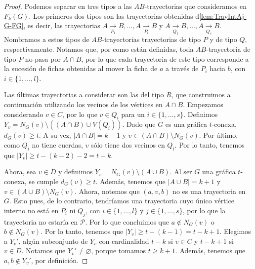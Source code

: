 \begin{proof}
    Podemos separar en tres tipos a las $AB$-trayectorias que consideramos en
    $F_{k}(G)$. Los primeros dos tipos son las trayectorias obtenidas
    d\cref{lem:TrayIntAj-G-FG}, es decir, las trayectorias $A
    \xrightarrow[P_1]{}  B, \dots, A \xrightarrow[P_l]{}  B$ y $A
    \xrightarrow[Q_1]{}  B, \dots, A \xrightarrow[Q_s]{}  B$. Nombramos a estos
    tipos de $AB$-trayectorias trayectorias de tipo $P$ y de tipo $Q$,
    respectivamente. Notamos que, por como est\'an definidas, toda
    $AB$-trayectoria de tipo $P$ no pasa por $A\cap B$, por lo que cada
    trayectoria de este tipo corresponde a la sucesi\'on de fichas obtenidas al
    mover la ficha de $a$ a trav\'es de $P_i$ hacia $b$, con $i \in \{1, \dots,
    l\}$.
    
    Las \'ultimas trayectorias a considerar son las del tipo $R$, que
    construimos a continuaci\'on utilizando los vecinos de los v\'ertices en $A
    \cap B$. Empezamos considerando $v \in C$, por lo que $v \in Q_i$ para un
    $i \in \{1, \dots, s\}$. Definimos $Y_v = N_G(v) \setminus ((A \cap B) \cup
    V(Q_i))$. Dado que $G$ es una gr\'afica $t$-conexa, $d_G(v) \geq t$. A su
    vez, $|A \cap B| =k -1$ y $v \in (A \cap B) \setminus N_G(v)$. Por \'ultimo,
    como $Q_i$ no tiene cuerdas, $v$ s\'olo tiene dos vecinos en $Q_i$. Por lo
    tanto, tenemos que $|Y_v| \geq t- (k-2)-2 = t-k$. 
    
    Ahora, sea $v \in D$ y definimos $Y_v = N_G(v) \setminus (A \cup B)$. Al ser
    $G$ una gr\'afica $t$-conexa, se cumple $d_G(v) \geq t$. Adem\'as, tenemos
    que $|A \cup B| = k + 1$ y $v \in (A \cup B) \setminus N_G(v)$. Ahora,
    notemos que $(a, v, b)$ no es una trayectoria en $G$. Esto pues, de lo
    contrario, tendr\'iamos una trayectoria cuyo \'unico v\'ertice interno no
    est\'a en $P_i$ ni $Q_j$, con $i \in \{1, \dots, l\}$ y $j \in \{1, \dots,
    s\}$, por lo que la trayectoria no estar\'ia en $\mathcal{P}$. Por lo que
    concluimos que $a \notin N_G(v)$ o $b \notin N_G(v)$. Por lo tanto, tenemos
    que $|Y_v| \geq t- (k-1) = t-k + 1$. Elegimos a $Y_v '$, alg\'un subconjunto
    de $Y_v$ con cardinalidad $t-k$ si $v \in C$ y $t- k+ 1$ si $v \in D$.
    Notamos que $Y_v ' \neq \varnothing$, porque tomamos $t \geq k + 1$.
    Adem\'as, tenemos que $a, b \notin Y_v '$, por definici\'on. 


\end{proof}
